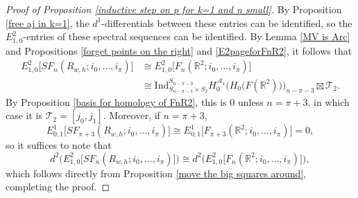 \documentclass[pagebackref,colorlinks,citecolor=blue,linkcolor=blue,urlcolor=blue,filecolor=blue]{article}
\theoremstyle{definition}\newtheorem{definition}[thm]{Definition}
\theoremstyle{definition}
\newcommand{\R}{\ensuremath{\mathbb{R}}}
\begin{document}
\begin{proof}[Proof of Proposition \ref{inductive step on p for k=1 and n small}]
By Proposition \ref{free aj in k=1}, the $d^{1}$-differentials between these entries can be identified, so the $E^{2}_{1,0}$-entries of these spectral sequences can be identified. 
By Lemma \ref{MV is Arc} and Propositions \ref{forget points on the right} and \ref{E2pageforFnR2}, it follows that 
\begin{align*}
E^{2}_{1,0}\big[SF_{n}(R_{w, h};i_{0},\dots, i_{\pi})\big]&\cong E^{2}_{1,0}\big[F_{n}(\R^{2};i_{0},\dots, i_{\pi})\big]\\
&\cong \text{Ind}^{S_{n-\pi-3}}_{S_{n-\pi-1}\times S_{2}}H^{\mathcal{A}_{1}}_{0}\Big(H_{0}\big(F(\R^{2})\big)\Big)_{n-\pi-3}\boxtimes \mathcal{T}_{2}.
\end{align*}
By Proposition \ref{basis for homology of FnR2}, this is $0$ unless $n=\pi+3$, in which case it is $\mathcal{T}_{2}=[j_{0}, j_{1}]$.
Moreover, if $n=\pi+3$, 
\[
E^{1}_{0,1}\big[SF_{\pi+3}(R_{w,h}; i_{0}, \dots, i_{\pi})\big]\cong E^{1}_{0,1}\big[F_{\pi+3}(\R^{2}; i_{0}, \dots, i_{\pi})\big]=0,
\]
so it suffices to note that 
\[
d^{2}\Big(E^{2}_{1,0}\big[SF_{n}(R_{w, h};i_{0},\dots, i_{\pi})\big]\Big)\cong d^{2}\Big(E^{2}_{1,0}\big[F_{n}(\R^{2};i_{0},\dots, i_{\pi})\big]\Big),
\]
which follows directly from Proposition \ref{move the big squares around}, completing the proof.
\end{proof}
\end{document}
